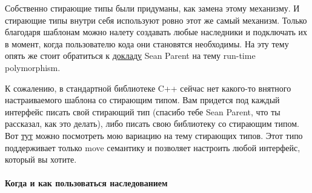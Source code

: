 \documentclass{article}
\begin{document}
Собственно стирающие типы были придуманы, как замена этому механизму. И стирающие типы внутри себя используют ровно этот же самый механизм. Только благодаря шаблонам можно налету создавать любые наследники и подключать их в момент, когда пользователю кода они становятся необходимы. На эту тему опять же стоит обратиться к \href{https://www.youtube.com/watch?v=QGcVXgEVMJg}{докладу} Sean Parent на тему run-time polymorphism.

К сожалению, в стандартной библиотеке C++ сейчас нет какого-то внятного настраиваемого шаблона со стирающим типом. Вам придется под каждый интерфейс писать свой стирающий тип (спасибо тебе Sean Parent, что ты рассказал, как это делать), либо писать свою библиотеку со стирающим типом. Вот \href{https://github.com/DimaTrushin/Library/tree/master/AnyObject}{тут} можно посмотреть мою вариацию на тему стирающих типов. Этот типо поддерживает только move семантику и позволяет настроить любой интерфейс, который вы хотите.

\paragraph{Когда и как пользоваться наследованием}
\end{document}
